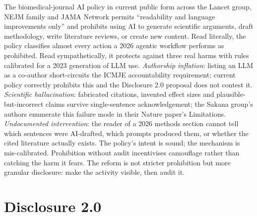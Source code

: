\documentclass[11pt,a4paper]{article}
\begin{document}
The biomedical-journal AI policy in current public form across the Lancet group, NEJM family and JAMA Network permits ``readability and language improvements only''\citep{lancetaipolicy2024} and prohibits using AI to generate scientific arguments, draft methodology, write literature reviews, or create new content. Read literally, the policy classifies almost every action a 2026 agentic workflow performs as prohibited. Read sympathetically, it protects against three real harms with rules calibrated for a 2023 generation of LLM use. \emph{Authorship inflation}: listing an LLM as a co-author short-circuits the ICMJE accountability requirement; current policy correctly prohibits this and the Disclosure 2.0 proposal does not contest it. \emph{Scientific hallucination}: fabricated citations, invented effect sizes and plausible-but-incorrect claims survive single-sentence acknowledgement; the Sakana group's authors enumerate this failure mode in their Nature paper's Limitations\citep{luSakana2026}. \emph{Undocumented intervention}: the reader of a 2026 methods section cannot tell which sentences were AI-drafted, which prompts produced them, or whether the cited literature actually exists. The policy's intent is sound; the mechanism is mis-calibrated. Prohibition without audit incentivises camouflage rather than catching the harm it fears. The reform is not stricter prohibition but more granular disclosure: make the activity visible, then audit it.

\section{Disclosure 2.0}
\end{document}
